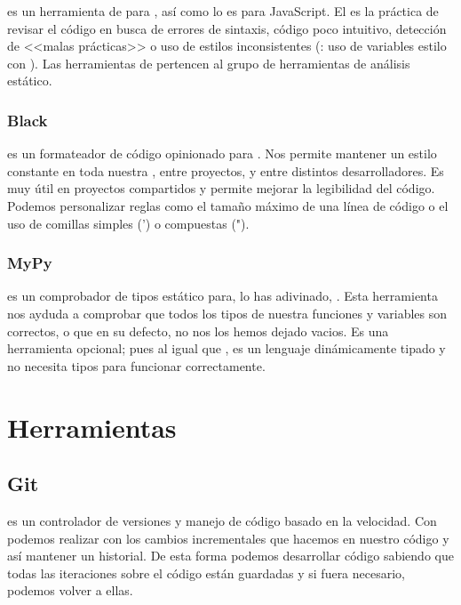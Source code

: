  es un herramienta de  para , así como  lo es para JavaScript. El  es la práctica de revisar el código en busca de errores de sintaxis, código poco intuitivo, detección de <<malas prácticas>> o uso de estilos inconsistentes (\pe: uso de variables estilo  con ). Las herramientas de  pertencen al grupo de herramientas de análisis estático.

\subsubsection{Black}

 es un formateador de código opinionado para . Nos permite mantener un estilo constante en toda nuestra , entre proyectos, y entre distintos desarrolladores. Es muy útil en proyectos compartidos y permite mejorar la legibilidad del código. Podemos personalizar reglas como el tamaño máximo de una línea de código o el uso de comillas simples (') o compuestas (").

\subsubsection{MyPy}

 es un comprobador de tipos estático para, lo has adivinado, . Esta herramienta nos ayduda a comprobar que todos los tipos de nuestra funciones y variables son correctos, o que en su defecto, no nos los hemos dejado vacios. Es una herramienta opcional; pues al igual que ,  es un lenguaje dinámicamente tipado y no necesita tipos para funcionar correctamente.


\section{Herramientas}

\subsection{Git}

 es un controlador de versiones y manejo de código basado en la velocidad. Con  podemos realizar  con los cambios incrementales que hacemos en nuestro código y así mantener un historial. De esta forma podemos desarrollar código sabiendo que todas las iteraciones sobre el código están guardadas y si fuera necesario, podemos volver a ellas.

